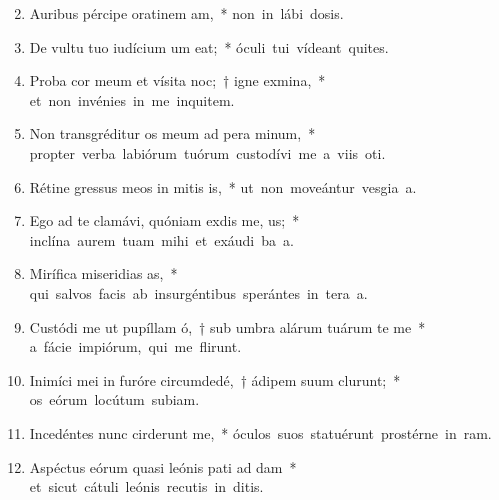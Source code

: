 \begin{flushleft}
\begin{enumerate}[leftmargin=*]
\setcounter{enumi}{1}

\item Auribus pércipe oratinem am,~* \mbox{non in lábi dosis.}

\item De vultu tuo iudícium um eat;~* \mbox{óculi tui vídeant quites.}

\item Proba cor meum et vísita noc;~† igne  exmina,~* \mbox{et non invénies in me inquitem.}

\item Non transgréditur os meum ad pera minum,~* \mbox{propter verba labiórum tuórum custodívi me a viis oti.}

\item Rétine gressus meos in mitis is,~* \mbox{ut non moveántur vesgia a.}

\item Ego ad te clamávi, quóniam exdis me, us;~* \mbox{inclína aurem tuam mihi et exáudi ba a.}

\item Mirífica miseridias as,~* \mbox{qui salvos facis ab insurgéntibus sperántes in tera a.}

\item Custódi me ut pupíllam ó,~† sub umbra alárum tuárum te me~* \mbox{a fácie impiórum, qui me flirunt.}

\item Inimíci mei in furóre circumdedé,~† ádipem suum clurunt;~* \mbox{os eórum locútum  subiam.}

\item Incedéntes nunc cirderunt me,~* \mbox{óculos suos statuérunt prostérne in ram.}

\item Aspéctus eórum quasi leónis pati ad dam~* \mbox{et sicut cátuli leónis recutis in ditis.}


\end{enumerate}
\end{flushleft}
